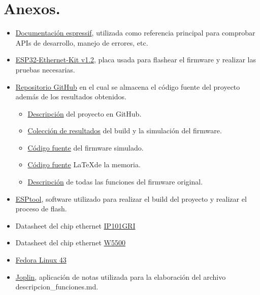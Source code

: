 \documentclass[a4paper,11pt]{article}
\begin{document}
\section{Anexos.}
\begin{itemize}
	\item \href{https://docs.espressif.com/projects/esp-idf/en/stable/esp32/api-reference/index.html}{Documentación espressif}, utilizada como referencia principal para comprobar APIs de desarrollo, manejo de errores, etc.
	\item \href{https://docs.espressif.com/projects/esp-dev-kits/en/latest/esp32/esp32-ethernet-kit/user_guide.html}{ESP32-Ethernet-Kit v1.2}, placa usada para flashear el firmware y realizar las pruebas necesarias.
	\item \href{https://github.com/Robinhood-700/gateway-eth-5g-privado}{Repositorio GitHub} en el cual se almacena el código fuente del proyecto además de los resultados obtenidos.
		\begin{itemize}
			\item \href{https://github.com/Robinhood-700/gateway-eth-5g-privado/blob/main/README.md}{Descripción} del proyecto en GitHub.
			\item \href{https://github.com/Robinhood-700/gateway-eth-5g-privado/tree/main/resultados}{Colección de resultados} del build y la simulación del firmware.
			\item \href{https://github.com/Robinhood-700/gateway-eth-5g-privado/tree/main/firmware/esp32_gateway}{Código fuente} del firmware simulado.
			\item \href{https://github.com/Robinhood-700/gateway-eth-5g-privado/blob/main/doc/memoria_final.tex}{Código fuente} \LaTeX de la memoria.
			\item \href{https://github.com/Robinhood-700/gateway-eth-5g-privado/blob/main/doc/descripcion_funciones.md}{Descripción} de todas las funciones del firmware original.
		\end{itemize}
	\item \href{https://github.com/espressif/esptool}{ESPtool}, software utilizado para realizar el build del proyecto y realizar el proceso de flash.
	\item Datasheet del chip ethernet \href{https://www.lcsc.com/datasheet/C703537.pdf?spm=wm.sxq.inf.ggs&lcsc_vid=RlVdUlUEQVNXX1RRRQNaUlxeEwReBgJQQVNaAl1TRFExVlNeRVVZVlNUT1JYVTsOAxUeFF5JWAUbBA8CAgIFAAtIFA4DSA%3D%3D}{IP101GRI}
	\item Datasheet del chip ethernet \href{https://docs.wiznet.io/img/products/w5500/W5500_ds_v110e.pdf}{W5500}
	\item \href{https://fedoraproject.org/}{Fedora Linux 43}
	\item \href{https://joplinapp.org/}{Joplin}, aplicación de notas utilizada para la elaboración del archivo descripcion\_funciones.md.
\end{itemize}
\thispagestyle{fancy}
\fancyfoot[C]{\thepage}
\fancyfoot[R]{\today}
\end{document}
